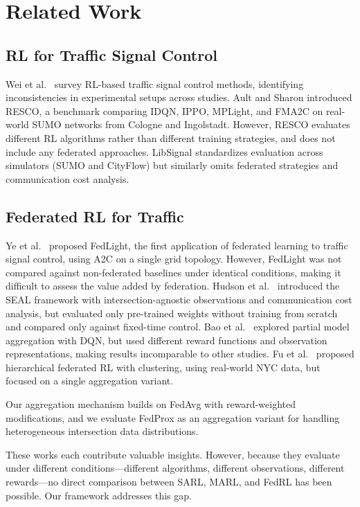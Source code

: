 \documentclass[conference]{IEEEtran}
\begin{document}
\section{Related Work}

\subsection{RL for Traffic Signal Control}

Wei et al.\ \cite{b_wei_survey} survey RL-based traffic signal control methods, identifying inconsistencies in experimental setups across studies. Ault and Sharon \cite{b_resco} introduced RESCO, a benchmark comparing IDQN, IPPO, MPLight, and FMA2C on real-world SUMO networks from Cologne and Ingolstadt. However, RESCO evaluates different RL algorithms rather than different training strategies, and does not include any federated approaches. LibSignal \cite{b_libsignal} standardizes evaluation across simulators (SUMO and CityFlow) but similarly omits federated strategies and communication cost analysis.

\subsection{Federated RL for Traffic}

Ye et al.\ \cite{b_fedlight} proposed FedLight, the first application of federated learning to traffic signal control, using A2C on a single grid topology. However, FedLight was not compared against non-federated baselines under identical conditions, making it difficult to assess the value added by federation. Hudson et al.\ \cite{b_seal} introduced the SEAL framework with intersection-agnostic observations and communication cost analysis, but evaluated only pre-trained weights without training from scratch and compared only against fixed-time control. Bao et al.\ \cite{b_bao} explored partial model aggregation with DQN, but used different reward functions and observation representations, making results incomparable to other studies. Fu et al.\ \cite{b_hfrl} proposed hierarchical federated RL with clustering, using real-world NYC data, but focused on a single aggregation variant.

Our aggregation mechanism builds on FedAvg \cite{b_fedavg} with reward-weighted modifications, and we evaluate FedProx \cite{b_fedprox} as an aggregation variant for handling heterogeneous intersection data distributions.

These works each contribute valuable insights. However, because they evaluate under different conditions---different algorithms, different observations, different rewards---no direct comparison between SARL, MARL, and FedRL has been possible. Our framework addresses this gap.
\end{document}
